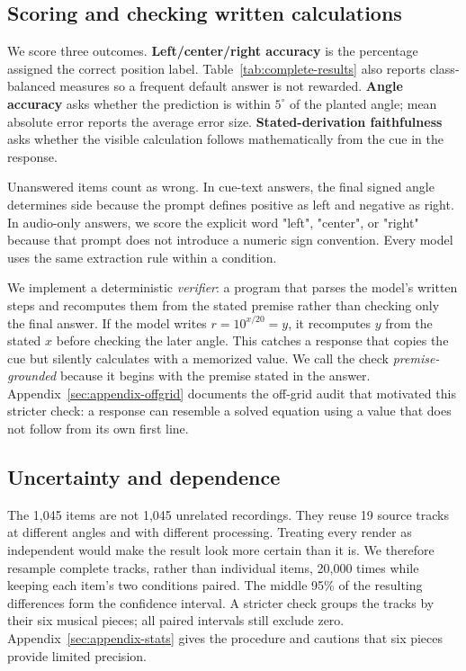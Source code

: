 \documentclass{article}
\begin{document}
\subsection{Scoring and checking written calculations}

We score three outcomes. \textbf{Left/center/right accuracy} is the percentage assigned the correct position label. Table~\ref{tab:complete-results} also reports class-balanced measures so a frequent default answer is not rewarded. \textbf{Angle accuracy} asks whether the prediction is within \(5^\circ\) of the planted angle; mean absolute error reports the average error size. \textbf{Stated-derivation faithfulness} asks whether the visible calculation follows mathematically from the cue in the response.

Unanswered items count as wrong. In cue-text answers, the final signed angle determines side because the prompt defines positive as left and negative as right. In audio-only answers, we score the explicit word "left", "center", or "right" because that prompt does not introduce a numeric sign convention. Every model uses the same extraction rule within a condition.

We implement a deterministic \emph{verifier}: a program that parses the model's written steps and recomputes them from the stated premise rather than checking only the final answer. If the model writes \(r=10^{x/20}=y\), it recomputes \(y\) from the stated \(x\) before checking the later angle. This catches a response that copies the cue but silently calculates with a memorized value. We call the check \emph{premise-grounded} because it begins with the premise stated in the answer. Appendix~\ref{sec:appendix-offgrid} documents the off-grid audit that motivated this stricter check: a response can resemble a solved equation using a value that does not follow from its own first line.

\subsection{Uncertainty and dependence}
\label{sec:uncertainty}

The 1,045 items are not 1,045 unrelated recordings. They reuse 19 source tracks at different angles and with different processing. Treating every render as independent would make the result look more certain than it is. We therefore resample complete tracks, rather than individual items, 20,000 times while keeping each item's two conditions paired. The middle 95\% of the resulting differences form the confidence interval. A stricter check groups the tracks by their six musical pieces; all paired intervals still exclude zero. Appendix~\ref{sec:appendix-stats} gives the procedure and cautions that six pieces provide limited precision.
\end{document}
